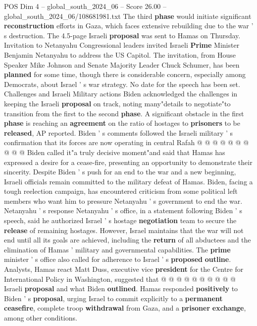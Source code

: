 \begin{textsample}{POS Dim 4 – global\_south\_2024\_06 – Score 26.00 – global\_south\_2024\_06/108681981.txt}
The third \textbf{phase} would initiate significant \textbf{reconstruction} efforts in Gaza, which faces extensive rebuilding due to the war ' s destruction.
The 4.5-page Israeli \textbf{proposal} was sent to Hamas on Thursday.
Invitation to Netanyahu Congressional leaders invited Israeli \textbf{Prime} Minister Benjamin Netanyahu to address the US Capitol.
The invitation, from House Speaker Mike Johnson and Senate Majority Leader Chuck Schumer, has been \textbf{planned} for some time, though there is considerable concern, especially among Democrats, about Israel ' s war strategy.
No date for the speech has been set.
Challenges and Israeli Military actions Biden acknowledged the challenges in keeping the Israeli \textbf{proposal} on track, noting many"details to negotiate"to transition from the first to the second \textbf{phase}.
A significant obstacle in the first \textbf{phase} is reaching an \textbf{agreement} on the ratio of hostages to \textbf{prisoners} to be \textbf{released}, AP reported.
Biden ' s comments followed the Israeli military ' s confirmation that its forces are now operating in central Rafah @ @ @ @ @ @ @ @ @ @ Biden called it"a truly decisive moment"and said that Hamas has expressed a desire for a cease-fire, presenting an opportunity to demonstrate their sincerity.
Despite Biden ' s push for an end to the war and a new beginning, Israeli officials remain committed to the military defeat of Hamas.
Biden, facing a tough reelection campaign, has encountered criticism from some political left members who want him to pressure Netanyahu ' s government to end the war.
Netanyahu ' s response Netanyahu ' s office, in a statement following Biden ' s speech, said he authorized Israel ' s hostage \textbf{negotiation} team to secure the \textbf{release} of remaining hostages.
However, Israel maintains that the war will not end until all its goals are achieved, including the \textbf{return} of all abductees and the elimination of Hamas ' military and governmental capabilities.
The \textbf{prime} minister ' s office also called for adherence to Israel ' s \textbf{proposed} \textbf{outline}.
Analysts, Hamas react Matt Duss, executive vice \textbf{president} for the Centre for International Policy in Washington, suggested that @ @ @ @ @ @ @ @ @ @ Israeli \textbf{proposal} and what Biden \textbf{outlined}.
Hamas responded \textbf{positively} to Biden ' s \textbf{proposal}, urging Israel to commit explicitly to a \textbf{permanent} \textbf{ceasefire}, complete troop \textbf{withdrawal} from Gaza, and a \textbf{prisoner} \textbf{exchange}, among other conditions.

\end{textsample}
